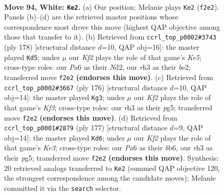 \documentclass[11pt]{article}
\begin{document}
\clearpage

\begin{figure}[p]\centering
\begin{subfigure}{0.46\textwidth}\centering
\resizebox{\linewidth}{!}{%
\newchessgame
\chessboard[
  setfen={8/5k2/PR2n3/8/8/7r/5K2/8 w - - 15 94},
  showmover=false,
  pgfstyle=straightmove, color=movearrow, markmove={f2-e2}
]}
\caption{}
\end{subfigure}\hfill
\begin{subfigure}{0.46\textwidth}\centering
\resizebox{\linewidth}{!}{%
\newchessgame
\chessboard[
  setfen={8/n7/1k6/4K3/8/8/R2Nb3/8 w - - 41 90},
  showmover=false,
  pgfstyle=straightmove, color=movearrow, markmove={e5-d5}
]}
\caption{}
\end{subfigure}
\\[4pt]
\begin{subfigure}{0.46\textwidth}\centering
\resizebox{\linewidth}{!}{%
\newchessgame
\chessboard[
  setfen={3R4/8/3nk3/6p1/6P1/5K2/8/8 w - - 35 89},
  showmover=false,
  pgfstyle=straightmove, color=movearrow, markmove={f3-g3}
]}
\caption{}
\end{subfigure}\hfill
\begin{subfigure}{0.46\textwidth}\centering
\resizebox{\linewidth}{!}{%
\newchessgame
\chessboard[
  setfen={8/8/1B2k3/6P1/2r4N/6K1/8/8 b - - 8 89},
  showmover=false,
  pgfstyle=straightmove, color=movearrow, markmove={e6-d6}
]}
\caption{}
\end{subfigure}
\caption{\textbf{Move 94, White: \texttt{Ke2}.} (a) Our position; Melanie plays \texttt{Ke2} (\texttt{f2e2}). Panels (b)--(d) are the retrieved master positions whose correspondence most drove this move (highest QAP objective among those that transfer to it). (b) Retrieved from \texttt{ccrl\_top\_p0002\#3743} (ply 178) [structural distance $d$=10, QAP obj=16]: the master played \texttt{Kd5}; under $\mu$ our \emph{Kf2} plays the role of that game's \emph{Ke5}; cross-type roles: our \emph{P}a6 as their \emph{N}d2, our \emph{r}h3 as their \emph{b}e2; transferred move \texttt{f2e2} \textbf{(endorses this move)}. (c) Retrieved from \texttt{ccrl\_top\_p0002\#3667} (ply 176) [structural distance $d$=10, QAP obj=14]: the master played \texttt{Kg3}; under $\mu$ our \emph{Kf2} plays the role of that game's \emph{Kf3}; cross-type roles: our \emph{r}h3 as their \emph{p}g5; transferred move \texttt{f2e2} \textbf{(endorses this move)}. (d) Retrieved from \texttt{ccrl\_top\_p0001\#2879} (ply 177) [structural distance $d$=9, QAP obj=14]: the master played \texttt{Kd6}; under $\mu$ our \emph{Kf2} plays the role of that game's \emph{Ke3}; cross-type roles: our \emph{P}a6 as their \emph{b}b6, our \emph{r}h3 as their \emph{p}g5; transferred move \texttt{f2e2} \textbf{(endorses this move)}. Synthesis: 20 retrieved analogs transferred to \texttt{Ke2} (summed QAP objective 120, the strongest correspondence among the candidate moves); Melanie committed it via the \texttt{search} selector.}
\label{fig:thought-m186}
\end{figure}
\end{document}
